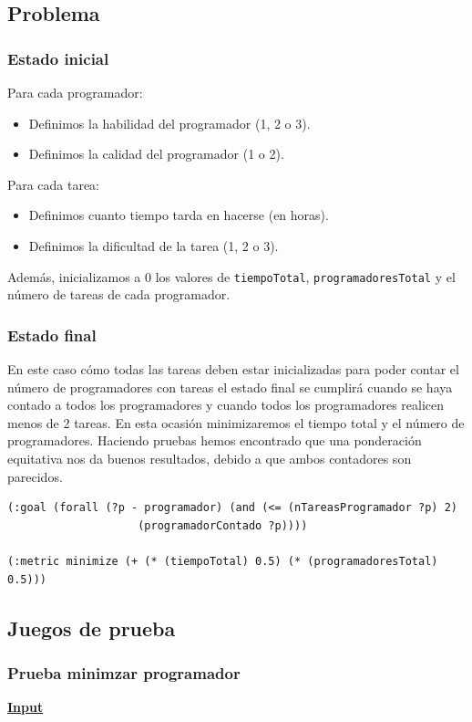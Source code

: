\documentclass[11pt]{article}
\begin{document}
\subsection{Problema}
\subsubsection{Estado inicial}
Para cada programador:
\begin{itemize}
  	\item Definimos la habilidad del programador (1, 2 o 3).
  	\item Definimos la calidad del programador (1 o 2).
\end{itemize}

\noindent Para cada tarea:
\begin{itemize}
  	\item Definimos cuanto tiempo tarda en hacerse (en horas).
  	\item Definimos la dificultad de la tarea (1, 2 o 3).
\end{itemize}

\noindent Además, inicializamos a 0 los valores de \texttt{tiempoTotal}, \texttt{programadoresTotal} y el número de tareas de cada programador. 

\subsubsection{Estado final}
En este caso cómo todas las tareas deben estar inicializadas para poder contar el número de programadores con tareas el estado final se cumplirá cuando se haya contado a todos los programadores y cuando todos los programadores realicen menos de 2 tareas.
En esta ocasión minimizaremos el tiempo total y el número de programadores. Haciendo pruebas hemos encontrado que una ponderación equitativa nos da buenos resultados, debido a que ambos contadores son parecidos.

\begin{verbatim}
(:goal (forall (?p - programador) (and (<= (nTareasProgramador ?p) 2)
					(programadorContado ?p))))
    
(:metric minimize (+ (* (tiempoTotal) 0.5) (* (programadoresTotal) 0.5)))
\end{verbatim}
\subsection{Juegos de prueba}
\subsubsection{Prueba minimzar programador}
\underline{\textbf{Input}}\\
\end{document}
